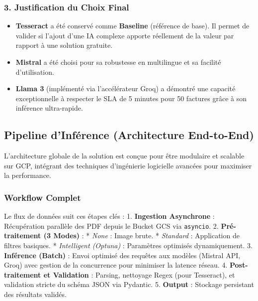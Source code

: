 \documentclass[
  letterpaper,
  DIV=11,
  numbers=noendperiod]{scrartcl}
\providecommand{\tightlist}{%
  \setlength{\itemsep}{0pt}\setlength{\parskip}{0pt}}
\begin{document}
\subsubsection{3. Justification du Choix
Final}\label{justification-du-choix-final}

\begin{itemize}
\tightlist
\item
  \textbf{Tesseract} a été conservé comme \textbf{Baseline} (référence
  de base). Il permet de valider si l'ajout d'une IA complexe apporte
  réellement de la valeur par rapport à une solution gratuite.
\item
  \textbf{Mistral} a été choisi pour sa robustesse en multilingue et sa
  facilité d'utilisation.
\item
  \textbf{Llama 3} (implémenté via l'accélérateur Groq) a démontré une
  capacité exceptionnelle à respecter le SLA de 5 minutes pour 50
  factures grâce à son inférence ultra-rapide.
\end{itemize}

\subsection{Pipeline d'Inférence (Architecture
End-to-End)}\label{pipeline-dinfuxe9rence-architecture-end-to-end}

L'architecture globale de la solution est conçue pour être modulaire et
scalable sur GCP, intégrant des techniques d'ingénierie logicielle
avancées pour maximiser la performance.

\subsubsection{Workflow Complet}\label{workflow-complet}

Le flux de données suit ces étapes clés : 1. \textbf{Ingestion
Asynchrone} : Récupération parallèle des PDF depuis le Bucket GCS via
\texttt{asyncio}. 2. \textbf{Pré-traitement (3 Modes)} : * \emph{None} :
Image brute. * \emph{Standard} : Application de filtres basiques. *
\emph{Intelligent (Optuna)} : Paramètres optimisés dynamiquement. 3.
\textbf{Inférence (Batch)} : Envoi optimisé des requêtes aux modèles
(Mistral API, Groq) avec gestion de la concurrence pour minimiser la
latence réseau. 4. \textbf{Post-traitement et Validation} : Parsing,
nettoyage Regex (pour Tesseract), et validation stricte du schéma JSON
via Pydantic. 5. \textbf{Output} : Stockage persistant des résultats
validés.
\end{document}
